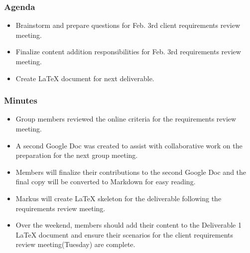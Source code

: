 \documentclass{article}
\begin{document}
\subsubsection{Agenda}
\begin{itemize}
\item Brainstorm and prepare questions for Feb. 3rd client 
requirements review meeting.
\item Finalize content addition responsibilities for Feb. 
3rd requirements review meeting.  
\item Create LaTeX document for next deliverable.
\end{itemize}
\subsubsection{Minutes}
\begin{itemize}
\item Group members reviewed the online criteria for the requirements 
review meeting.
\item A second Google Doc was created to assist with collaborative work 
on the preparation for the next group meeting.
\item Members will finalize their contributions to the second Google Doc 
and the final copy will be converted to Markdown for easy reading.
\item Markus will create LaTeX skeleton for the deliverable following the 
requirements review meeting.
\item Over the weekend, members should add their content to the Deliverable
 1 LaTeX document and ensure their scenarios for the client requirements 
 review meeting(Tuesday) are complete.
\end{itemize}
\end{document}
